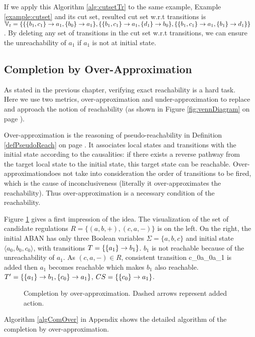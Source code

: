If we apply this Algorithm \ref{alg:cutsetTr} to the same example, Example \ref{example:cutset} and its cut set, resulted cut set w.r.t transitions is $\mathbb{V}_t= \{\{\acm{b_1,c_1}{}{a_1},\acm{b_0}{}{a_1}\},\{\acm{b_1,c_1}{}{a_1},\acm{d_1}{}{b_0}\},\{\acm{b_1,c_1}{}{a_1},\acm{b_1}{}{d_1}\}\}$.
By deleting any set of transitions in the cut set w.r.t transitions, we can ensure the unreachability of $a_1$ if $a_1$ is not at initial state.

\subsection{Completion by Over-Approximation}
As stated in the previous chapter, verifying exact reachability is a hard task.
Here we use two metrics, over-approximation and under-approximation to replace and approach the notion of reachability (as shown in Figure \ref{fig:vennDiagram} on page \pageref{fig:vennDiagram}).

Over-approximation is the reasoning of pseudo-reachability in Definition \ref{defPseudoReach} on page \pageref{defPseudoReach}. 
It associates local states and transitions with the initial state according to the causalities: if there exists a reverse pathway from the target local state to the initial state, this target state can be reachable.
Over-approximationdoes not take into consideration the order of transitions to be fired, which is the cause of inconclusiveness (literally it over-approximates the reachability).
Thus over-approximation is a necessary condition of the reachability.

Figure \ref{CompOv} gives a first impression of the idea.
The visualization of the set of candidate regulations $R=\{(a,b,+),(c,a,-)\}$ is on the left.
On the right, the initial ABAN has only three Boolean variables $\Sigma=\{a,b,c\}$ and initial state $\langle a_0,b_0,c_0\rangle$, with transitions $T=\{\acm{a_1}{b_0}{b_1}\}$.
$b_1$ is not reachable because of the unreachability of $a_1$.
As $(c,a,-)\in R$, consistent transition \ac{c_0}{a_0}{a_1} is added then $a_1$ becomes reachable which makes $b_1$ also reachable.
$T'=\{\acm{a_1}{b_0}{b_1},\acm{c_0}{a_0}{a_1}\}$, $CS=\{\acm{c_0}{a_0}{a_1}\}$.

\begin{figure}[ht]
\centering

\caption[Completion by over-approximation]{Completion by over-approximation. Dashed arrows represent added action.}\label{CompOv}
\end{figure}
Algorithm \ref{algComOver} in Appendix shows the detailed algorithm of the completion by over-approximation.

